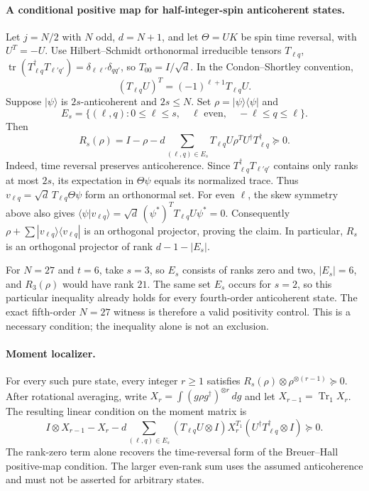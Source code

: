 \documentclass{article}
\begin{document}
\paragraph{A conditional positive map for half-integer-spin anticoherent states.}
Let $j=N/2$ with $N$ odd, $d=N+1$, and let
$\Theta=U K$ be spin time reversal, with $U^T=-U$.
Use Hilbert--Schmidt orthonormal irreducible tensors $T_{\ell q}$,
$\operatorname{tr}(T_{\ell q}^\dagger T_{\ell' q'})=
\delta_{\ell\ell'}\delta_{qq'}$, so $T_{00}=I/\sqrt d$.
In the Condon--Shortley convention,
\[
  (T_{\ell q}U)^T=(-1)^{\ell+1}T_{\ell q}U.
\]
Suppose $|\psi\rangle$ is $2s$-anticoherent and $2s\le N$.
Set $\rho=|\psi\rangle\langle\psi|$ and
\[
 E_s=\{(\ell,q):0\le\ell\le s,\quad\ell\text{ even},
              \quad-\ell\le q\le\ell\}.
\]
Then
\[
 \boxed{\quad R_s(\rho)=I-\rho-
   d\sum_{(\ell,q)\in E_s}
    T_{\ell q}U\rho^T U^\dagger T_{\ell q}^\dagger
    \succeq0.\quad}
\]
Indeed, time reversal preserves anticoherence. Since
$T_{\ell q}^\dagger T_{\ell' q'}$ contains only ranks at most $2s$,
its expectation in $\Theta\psi$ equals its normalized trace.
Thus $v_{\ell q}=\sqrt d\,T_{\ell q}\Theta\psi$ form an orthonormal set.
For even $\ell$, the skew symmetry above also gives
$\langle\psi|v_{\ell q}\rangle=
\sqrt d\,(\psi^*)^T T_{\ell q}U\psi^*=0$.
Consequently $\rho+\sum|v_{\ell q}\rangle\langle v_{\ell q}|$
is an orthogonal projector, proving the claim. In particular,
$R_s$ is an orthogonal projector of rank
$d-1-|E_s|$.

For $N=27$ and $t=6$, take $s=3$, so $E_s$ consists of ranks zero and two,
$|E_s|=6$, and $R_3(\rho)$ would have rank $21$.
The same set $E_s$ occurs for $s=2$, so this particular inequality already
holds for every fourth-order anticoherent state. The exact fifth-order
$N=27$ witness is therefore a valid positivity control. This is a necessary
condition; the inequality alone is not an exclusion.

\paragraph{Moment localizer.}
For every such pure state, every integer $r\ge1$ satisfies
$R_s(\rho)\otimes\rho^{\otimes(r-1)}\succeq0$.
After rotational averaging, write
$X_r=\int(g\rho g^\dagger)^{\otimes r}\,dg$ and let
$X_{r-1}=\operatorname{Tr}_1X_r$.
The resulting linear condition on the moment matrix is
\[
 I\otimes X_{r-1}-X_r-d\sum_{(\ell,q)\in E_s}
 (T_{\ell q}U\otimes I)X_r^{T_1}
 (U^\dagger T_{\ell q}^\dagger\otimes I)\succeq0.
\]
The rank-zero term alone recovers the time-reversal form of the
Breuer--Hall positive-map condition. The larger even-rank sum
uses the assumed anticoherence and must not be asserted for arbitrary states.
\end{document}
